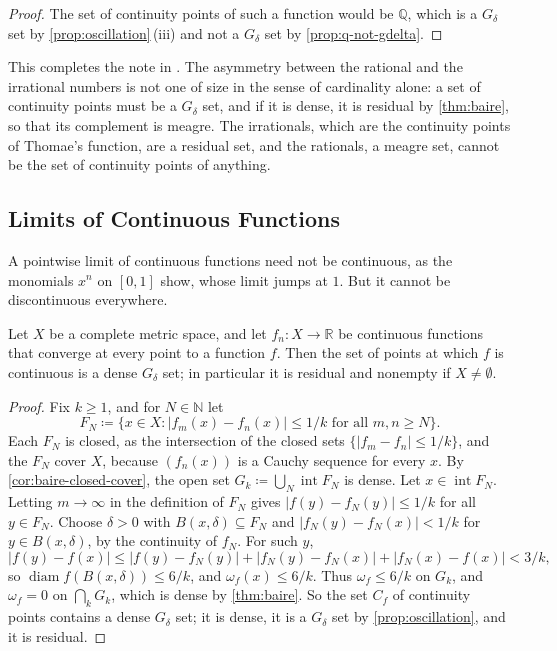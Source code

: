 \begin{proof}
The set of continuity points of such a function would be $\mathbb Q$, which is a $G_\delta$ set by \cref{prop:oscillation}\,(iii) and not a $G_\delta$ set by \cref{prop:q-not-gdelta}.
\end{proof}

This completes the note in . The asymmetry between the rational and the irrational numbers is not one of size in the sense of cardinality alone: a set of continuity points must be a $G_\delta$ set, and if it is dense, it is residual by \cref{thm:baire}, so that its complement is meagre. The irrationals, which are the continuity points of Thomae's function, are a residual set, and the rationals, a meagre set, cannot be the set of continuity points of anything.

\subsection{Limits of Continuous Functions}

A pointwise limit of continuous functions need not be continuous, as the monomials $x^n$ on $[0,1]$ show, whose limit jumps at $1$. But it cannot be discontinuous everywhere.

\begin{theorem}
\label{thm:baire-one}
Let $X$ be a complete metric space, and let $f_n\colon X\to\mathbb R$ be continuous functions that converge at every point to a function $f$. Then the set of points at which $f$ is continuous is a dense $G_\delta$ set; in particular it is residual and nonempty if $X\ne\emptyset$.
\end{theorem}

\begin{proof}
Fix $k\ge1$, and for $N\in\mathbb N$ let
\[
F_N\coloneqq\{x\in X: |f_m(x)-f_n(x)|\le1/k\text{ for all }m,n\ge N\} .
\]
Each $F_N$ is closed, as the intersection of the closed sets $\{|f_m-f_n|\le1/k\}$, and the $F_N$ cover $X$, because $(f_n(x))$ is a Cauchy sequence for every $x$. By \cref{cor:baire-closed-cover}, the open set $G_k\coloneqq\bigcup_N\operatorname{int}F_N$ is dense. Let $x\in\operatorname{int}F_N$. Letting $m\to\infty$ in the definition of $F_N$ gives $|f(y)-f_N(y)|\le1/k$ for all $y\in F_N$. Choose $\delta>0$ with $B(x,\delta)\subseteq F_N$ and $|f_N(y)-f_N(x)|<1/k$ for $y\in B(x,\delta)$, by the continuity of $f_N$. For such $y$,
\[
|f(y)-f(x)|\le|f(y)-f_N(y)|+|f_N(y)-f_N(x)|+|f_N(x)-f(x)|<3/k ,
\]
so $\operatorname{diam}f(B(x,\delta))\le6/k$, and $\omega_f(x)\le6/k$. Thus $\omega_f\le6/k$ on $G_k$, and $\omega_f=0$ on $\bigcap_kG_k$, which is dense by \cref{thm:baire}. So the set $C_f$ of continuity points contains a dense $G_\delta$ set; it is dense, it is a $G_\delta$ set by \cref{prop:oscillation}, and it is residual.
\end{proof}


